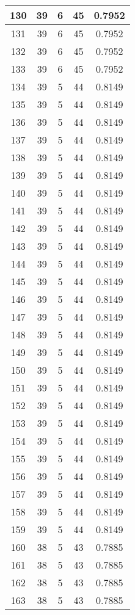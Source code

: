 \documentclass[letterpaper, 12pt]{article}
\begin{document}
\begin{longtable}{|c|c|c|c|c|}
\hline
130 & 39 & 6 & 45 & 0.7952 \\
\hline
131 & 39 & 6 & 45 & 0.7952 \\
\hline
132 & 39 & 6 & 45 & 0.7952 \\
\hline
133 & 39 & 6 & 45 & 0.7952 \\
\hline
134 & 39 & 5 & 44 & 0.8149 \\
\hline
135 & 39 & 5 & 44 & 0.8149 \\
\hline
136 & 39 & 5 & 44 & 0.8149 \\
\hline
137 & 39 & 5 & 44 & 0.8149 \\
\hline
138 & 39 & 5 & 44 & 0.8149 \\
\hline
139 & 39 & 5 & 44 & 0.8149 \\
\hline
140 & 39 & 5 & 44 & 0.8149 \\
\hline
141 & 39 & 5 & 44 & 0.8149 \\
\hline
142 & 39 & 5 & 44 & 0.8149 \\
\hline
143 & 39 & 5 & 44 & 0.8149 \\
\hline
144 & 39 & 5 & 44 & 0.8149 \\
\hline
145 & 39 & 5 & 44 & 0.8149 \\
\hline
146 & 39 & 5 & 44 & 0.8149 \\
\hline
147 & 39 & 5 & 44 & 0.8149 \\
\hline
148 & 39 & 5 & 44 & 0.8149 \\
\hline
149 & 39 & 5 & 44 & 0.8149 \\
\hline
150 & 39 & 5 & 44 & 0.8149 \\
\hline
151 & 39 & 5 & 44 & 0.8149 \\
\hline
152 & 39 & 5 & 44 & 0.8149 \\
\hline
153 & 39 & 5 & 44 & 0.8149 \\
\hline
154 & 39 & 5 & 44 & 0.8149 \\
\hline
155 & 39 & 5 & 44 & 0.8149 \\
\hline
156 & 39 & 5 & 44 & 0.8149 \\
\hline
157 & 39 & 5 & 44 & 0.8149 \\
\hline
158 & 39 & 5 & 44 & 0.8149 \\
\hline
159 & 39 & 5 & 44 & 0.8149 \\
\hline
160 & 38 & 5 & 43 & 0.7885 \\
\hline
161 & 38 & 5 & 43 & 0.7885 \\
\hline
162 & 38 & 5 & 43 & 0.7885 \\
\hline
163 & 38 & 5 & 43 & 0.7885 \\

\end{longtable}
\end{document}
